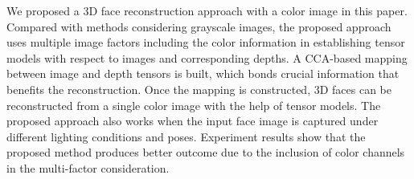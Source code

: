 
We proposed a 3D face reconstruction approach with a
color image in this paper. Compared with methods considering
grayscale images, the proposed approach uses multiple image
factors including the color information in establishing tensor
models with respect to images and corresponding depths.
A CCA-based mapping between image and depth tensors
is built, which bonds crucial information that benefits the
reconstruction. Once the mapping is constructed, 3D faces can
be reconstructed from a single color image with the help of
tensor models. The proposed approach also works when the
input face image is captured under different lighting conditions and poses. Experiment results show that the proposed method produces better outcome due to the inclusion of color channels in the multi-factor consideration. 
